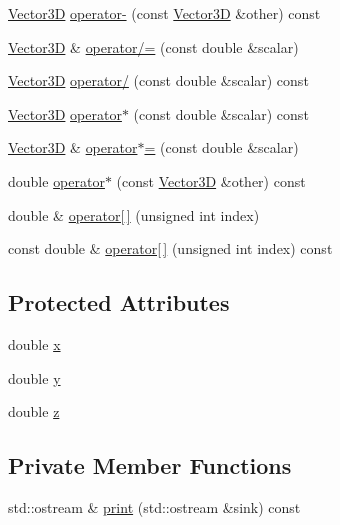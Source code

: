 \begin{DoxyCompactItemize}
\hyperlink{classVector3D}{Vector3D} \hyperlink{classVector3D_a0b5ffc2ccb4c4e514a77e80d407b6d59}{operator-\/} (const \hyperlink{classVector3D}{Vector3D} \&other) const 
\item 
\hyperlink{classVector3D}{Vector3D} \& \hyperlink{classVector3D_ac916f188b52f903688d475d8aa6c17fa}{operator/=} (const double \&scalar)
\item 
\hyperlink{classVector3D}{Vector3D} \hyperlink{classVector3D_a1e2eebf652124da9f50013848c64821b}{operator/} (const double \&scalar) const 
\item 
\hyperlink{classVector3D}{Vector3D} \hyperlink{classVector3D_ac592a2b896e4ae2f99d9653bee46b9d5}{operator$\ast$} (const double \&scalar) const 
\item 
\hyperlink{classVector3D}{Vector3D} \& \hyperlink{classVector3D_a30e301e07305ca5eb90d33296d53dc04}{operator$\ast$=} (const double \&scalar)
\item 
double \hyperlink{classVector3D_abdac4cf105b87dc57fa74a6956bd0da5}{operator$\ast$} (const \hyperlink{classVector3D}{Vector3D} \&other) const 
\item 
double \& \hyperlink{classVector3D_a4dcadc12bb40086b075c9559b78ed8d2}{operator\mbox{[}$\,$\mbox{]}} (unsigned int index)
\item 
const double \& \hyperlink{classVector3D_a653358f2fe88720a55f3285103da2b9c}{operator\mbox{[}$\,$\mbox{]}} (unsigned int index) const 
\end{DoxyCompactItemize}
\subsection*{Protected Attributes}
\begin{DoxyCompactItemize}
\item 
double \hyperlink{classVector3D_a3c086dfccfc57dd996e9b8600098a430}{x}
\item 
double \hyperlink{classVector3D_adcec384756103d26d1181e45d5a0fd78}{y}
\item 
double \hyperlink{classVector3D_a7321f3ff785f275c4d83f7d1b951752a}{z}
\end{DoxyCompactItemize}
\subsection*{Private Member Functions}
\begin{DoxyCompactItemize}
\item 
std\+::ostream \& \hyperlink{classVector3D_adbaa018adf859ca3cfa224a5f10c688a}{print} (std\+::ostream \&sink) const 
\end{DoxyCompactItemize}

